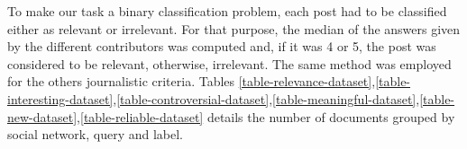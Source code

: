 To make our task a binary classification problem, each post had to be classified either as relevant or irrelevant.
For that purpose, the median of the answers given by the different contributors was computed and, if it was 4 or 5, the post was considered to be relevant, otherwise, irrelevant. The same method was employed for the others journalistic criteria.
Tables \ref{table-relevance-dataset},\ref{table-interesting-dataset},\ref{table-controversial-dataset},\ref{table-meaningful-dataset},\ref{table-new-dataset},\ref{table-reliable-dataset} details the number of documents grouped by social network, query and label.



\begin{table}[!htpb]
\centering
\footnotesize
{}
\caption{Documents grouped by source, relevance label and query}
\label{table-relevance-dataset}
\end{table}

